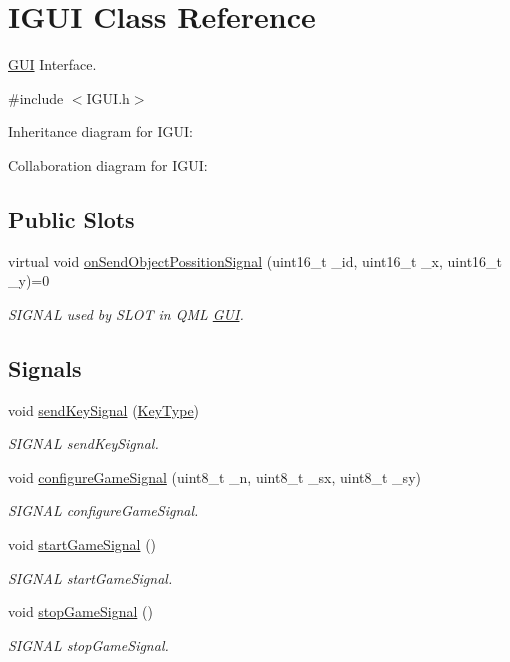 \hypertarget{class_i_g_u_i}{\section{I\+G\+U\+I Class Reference}
\label{class_i_g_u_i}
}


\hyperlink{class_g_u_i}{G\+U\+I} Interface.  




{\ttfamily \#include $<$I\+G\+U\+I.\+h$>$}



Inheritance diagram for I\+G\+U\+I\+:


Collaboration diagram for I\+G\+U\+I\+:
\subsection*{Public Slots}
\begin{DoxyCompactItemize}
\item 
virtual void \hyperlink{class_i_g_u_i_aff38798d3077ddeba0b84d689abf5145}{on\+Send\+Object\+Possition\+Signal} (uint16\+\_\+t \+\_\+id, uint16\+\_\+t \+\_\+x, uint16\+\_\+t \+\_\+y)=0
\begin{DoxyCompactList}\small\item\em S\+I\+G\+N\+A\+L used by S\+L\+O\+T in Q\+M\+L \hyperlink{class_g_u_i}{G\+U\+I}. \end{DoxyCompactList}\end{DoxyCompactItemize}
\subsection*{Signals}
\begin{DoxyCompactItemize}
\item 
void \hyperlink{class_i_g_u_i_aa462ce37550a750de58e1edcb566006c}{send\+Key\+Signal} (\hyperlink{_i_key_type_8h_aab0feaba617470cb4aa830dc5935238c}{Key\+Type})
\begin{DoxyCompactList}\small\item\em S\+I\+G\+N\+A\+L send\+Key\+Signal. \end{DoxyCompactList}\item 
void \hyperlink{class_i_g_u_i_ab8554cf829f7bd94c14b2a74ffdfef2f}{configure\+Game\+Signal} (uint8\+\_\+t \+\_\+n, uint8\+\_\+t \+\_\+sx, uint8\+\_\+t \+\_\+sy)
\begin{DoxyCompactList}\small\item\em S\+I\+G\+N\+A\+L configure\+Game\+Signal. \end{DoxyCompactList}\item 
void \hyperlink{class_i_g_u_i_a0d3796724d6ca722f1eef106f1bc4c5e}{start\+Game\+Signal} ()
\begin{DoxyCompactList}\small\item\em S\+I\+G\+N\+A\+L start\+Game\+Signal. \end{DoxyCompactList}\item 
void \hyperlink{class_i_g_u_i_ab861d9b23d8141d38b64330c8e68bec6}{stop\+Game\+Signal} ()
\begin{DoxyCompactList}\small\item\em S\+I\+G\+N\+A\+L stop\+Game\+Signal. \end{DoxyCompactList}\end{DoxyCompactItemize}
